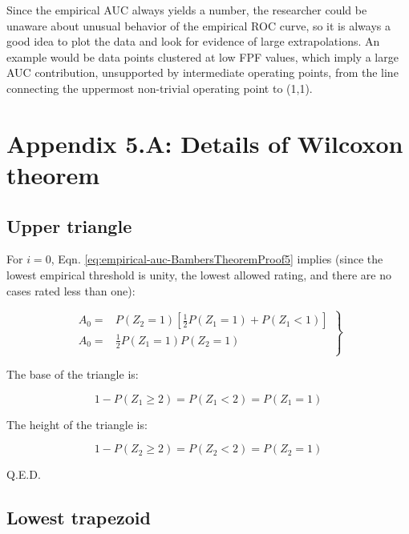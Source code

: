 \documentclass[
]{book}
\begin{document}
Since the empirical AUC always yields a number, the researcher could be unaware about unusual behavior of the empirical ROC curve, so it is always a good idea to plot the data and look for evidence of large extrapolations. An example would be data points clustered at low FPF values, which imply a large AUC contribution, unsupported by intermediate operating points, from the line connecting the uppermost non-trivial operating point to (1,1).

\hypertarget{empirical-auc-appendix-details-bamber-theorem}{%
\section{Appendix 5.A: Details of Wilcoxon theorem}\label{empirical-auc-appendix-details-bamber-theorem}}

\hypertarget{upper-triangle}{%
\subsection{Upper triangle}\label{upper-triangle}}

For \(i = 0\), Eqn. \eqref{eq:empirical-auc-BambersTheoremProof5} implies (since the lowest empirical threshold is unity, the lowest allowed rating, and there are no cases rated less than one):

\begin{equation}
\left. 
\begin{aligned}
A_0 =& P\left ( Z_2 = 1 \right )\left [ \frac{1}{2} P\left ( Z_1=1 \right ) + P\left ( Z_1<1 \right )\right ] \\
A_0 =& \frac{1}{2} P\left ( Z_1=1 \right ) P\left ( Z_2=1 \right )\\
\end{aligned}
\right \}
\end{equation}

The base of the triangle is:

\begin{equation}
1 - P\left ( Z_1 \geq 2 \right )=P\left ( Z_1 < 2 \right )=P\left ( Z_1 = 1 \right )
\end{equation}

The height of the triangle is:

\begin{equation}
1 - P\left ( Z_2 \geq 2 \right )=P\left ( Z_2 < 2 \right )=P\left ( Z_2 = 1 \right )
\end{equation}

Q.E.D.

\hypertarget{lowest-trapezoid}{%
\subsection{Lowest trapezoid}\label{lowest-trapezoid}}
\end{document}
